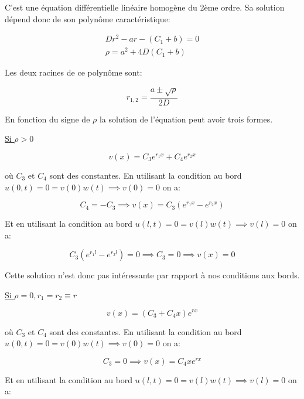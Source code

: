 \documentclass[a4paper, 12pt]{report}
\begin{document}
C'est une équation différentielle linéaire homogène du 2ème ordre. Sa solution
dépend donc de son polynôme caractéristique:

\begin{align}
  D r^2 - a r - (C_1 + b) = 0\\
  \rho = a^2 + 4 D (C_1 + b)
\end{align}

Les deux racines de ce polynôme sont:

\begin{equation}
   r_{1,2} = \frac{a \pm \sqrt{\rho}}{2 D}
 \end{equation}

En fonction du signe de $\rho$ la solution de l'équation peut avoir trois formes.

\underline{Si $\rho > 0$}

\begin{equation}
  v(x) = C_3 e^{r_1 x} + C_4 e^{r_2 x}
\end{equation}

où $C_3$ et $C_4$ sont des constantes. En utilisant la condition au bord
$u(0,t) = 0 = v(0) w(t) \implies v(0) = 0$ on a:

\begin{equation}
  C_4 = -C_3 \implies  v(x) = C_3 (e^{r_1 x} - e^{r_2 x})
\end{equation}

Et en utilisant la condition au bord $u(l,t) = 0 = v(l) w(t) \implies v(l) = 0$ on a:

\begin{equation}
  C_3 (e^{r_1 l} - e^{r_2 l}) = 0 \implies C_{3} = 0 \implies v(x) = 0
\end{equation}

Cette solution n'est donc pas intéressante par rapport à nos conditions aux bords.

\underline{Si $\rho = 0, r_1 = r_2 \equiv r$}

\begin{equation}
  v(x) = (C_3 + C_4 x) e^{r x}
\end{equation}

où $C_3$ et $C_4$ sont des constantes. En utilisant la condition au bord
$u(0,t) = 0 = v(0) w(t) \implies v(0) = 0$ on a:

\begin{equation}
  C_3 = 0 \implies   v(x) = C_4 x e^{r x}
\end{equation}

Et en utilisant la condition au bord $u(l,t) = 0 = v(l) w(t) \implies v(l) = 0$ on a:
\end{document}
